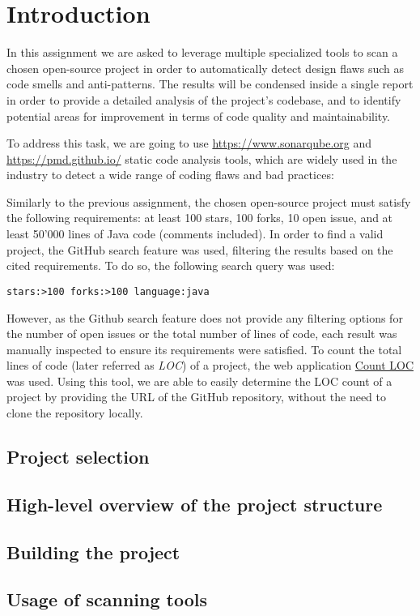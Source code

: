 \section{Introduction}

In this assignment we are asked to leverage multiple specialized tools to scan a chosen open-source project in order to automatically detect design flaws such as code smells and anti-patterns. The results will be condensed inside a single report in order to provide a detailed analysis of the project's codebase, and to identify potential areas for improvement in terms of code quality and maintainability.

To address this task, we are going to use \href{SonarQube}{https://www.sonarqube.org} and \href{PMD}{https://pmd.github.io/} static code analysis tools, which are widely used in the industry to detect a wide range of coding flaws and bad practices: 

Similarly to the previous assignment, the chosen open-source project must satisfy the following requirements: at least 100 stars, 100 forks, 10 open issue, and at least 50'000 lines of Java code (comments included). In order to find a valid project, the GitHub search feature was used, filtering the results based on the cited requirements. To do so, the following search query was used:

\begin{lstlisting}[caption=GitHub search query]
  stars:>100 forks:>100 language:java
\end{lstlisting}

However, as the Github search feature does not provide any filtering options for the number of open issues or the total number of lines of code, each result was manually inspected to ensure its requirements were satisfied. To count the total lines of code (later referred as \emph{LOC}) of a project, the web application \href{https://codetabs.com/count-loc/count-loc-online.html}{Count LOC} was used. Using this tool, we are able to easily determine the LOC count of a project by providing the URL of the GitHub repository, without the need to clone the repository locally. 

\subsection{Project selection}

\subsection{High-level overview of the project structure}

\subsection{Building the project}

\subsection{Usage of scanning tools}

